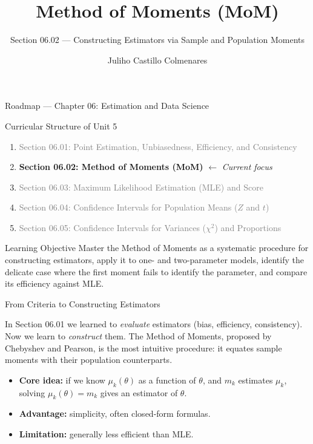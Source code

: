 \documentclass[aspectratio=169,xcolor={dvipsnames,table}]{beamer}
\title{Method of Moments (MoM)}
\subtitle{Section 06.02 --- Constructing Estimators via Sample and Population Moments}
\author[J. Castillo Colmenares]{Juliho Castillo Colmenares}
\institute[Tec de Monterrey]{Tecnologico de Monterrey}
\date{\vspace{-1.5cm}}
\begin{document}
\begin{frame}[plain]
	\titlepage
\end{frame}

\begin{frame}{Roadmap --- Chapter 06: Estimation and Data Science}
	\vspace{-0.15cm}
	\begin{block}{Curricular Structure of Unit 5}
		\footnotesize
		\begin{enumerate}\itemsep=0.03cm
			\item \textcolor{gray}{Section 06.01: Point Estimation, Unbiasedness, Efficiency, and Consistency}
			\item \textbf{\textcolor{TecRojo}{Section 06.02: Method of Moments (MoM)}} $\leftarrow$ \emph{Current focus}
			\item \textcolor{gray}{Section 06.03: Maximum Likelihood Estimation (MLE) and Score}
			\item \textcolor{gray}{Section 06.04: Confidence Intervals for Population Means ($Z$ and $t$)}
			\item \textcolor{gray}{Section 06.05: Confidence Intervals for Variances ($\chi^2$) and Proportions}
		\end{enumerate}
	\end{block}
	\vspace{-0.2cm}
	\begin{alertblock}{Learning Objective}
		\scriptsize
		Master the Method of Moments as a systematic procedure for constructing estimators, apply it to one- and two-parameter models, identify the delicate case where the first moment fails to identify the parameter, and compare its efficiency against MLE.
	\end{alertblock}
\end{frame}

\begin{frame}{From Criteria to Constructing Estimators}
	\footnotesize
	\begin{motivacion}
		In Section 06.01 we learned to \emph{evaluate} estimators (bias, efficiency, consistency). Now we learn to \emph{construct} them. The Method of Moments, proposed by Chebyshev and Pearson, is the most intuitive procedure: it equates sample moments with their population counterparts.
	\end{motivacion}
	\vspace{0.15cm}
	\pause
	\begin{itemize}\itemsep=0.1cm
		\item \textbf{Core idea:} if we know $\mu_k(\theta)$ as a function of $\theta$, and $m_k$ estimates $\mu_k$, solving $\mu_k(\theta)=m_k$ gives an estimator of $\theta$. \pause
		\item \textbf{Advantage:} simplicity, often closed-form formulas. \pause
		\item \textbf{Limitation:} generally less efficient than MLE.
	\end{itemize}
\end{frame}
\end{document}
